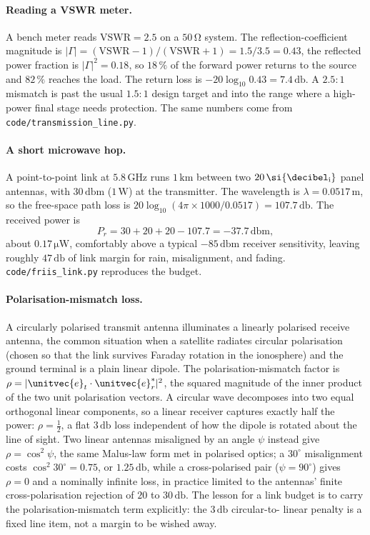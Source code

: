 \paragraph{Reading a VSWR meter.}
A bench meter reads $\text{VSWR} = 2.5$ on a $50\,\si{\ohm}$ system.
The reflection-coefficient magnitude is $|\Gamma| = (\text{VSWR}-1)/
(\text{VSWR}+1) = 1.5/3.5 = 0.43$, the reflected power fraction is
$|\Gamma|^{2} = 0.18$, so $18\,\%$ of the forward power returns to the
source and $82\,\%$ reaches the load. The return loss is $-20\log_{10}
0.43 = 7.4\,\si{\decibel}$. A $2.5{:}1$ mismatch is past the usual
$1.5{:}1$ design target and into the range where a high-power final
stage needs protection. The same numbers come from
\texttt{code/transmission\_line.py}.

\paragraph{A short microwave hop.}
A point-to-point link at $5.8\,\si{\giga\hertz}$ runs $1\,\si{\kilo
\meter}$ between two $20\,\si{\decibel\textsubscript{i}}$ panel
antennas, with $30\,\si{\decibel}\text{m}$ ($1\,\si{\watt}$) at the
transmitter. The wavelength is $\lambda = 0.0517\,\si{\meter}$, so the
free-space path loss is $20\log_{10}(4\pi\times 1000/0.0517) =
107.7\,\si{\decibel}$. The received power is
\[
P_{r} = 30 + 20 + 20 - 107.7 = -37.7\,\si{\decibel}\text{m},
\]
about $0.17\,\si{\micro\watt}$, comfortably above a typical
$-85\,\si{\decibel}\text{m}$ receiver sensitivity, leaving roughly
$47\,\si{\decibel}$ of link margin for rain, misalignment, and fading.
\texttt{code/friis\_link.py} reproduces the budget.

\paragraph{Polarisation-mismatch loss.}
A circularly polarised transmit antenna illuminates a linearly polarised
receive antenna, the common situation when a satellite radiates circular
polarisation (chosen so that the link survives Faraday rotation in the
ionosphere) and the ground terminal is a plain linear dipole. The
polarisation-mismatch factor is $\rho = |\unitvec{e}_{t}\cdot
\unitvec{e}_{r}^{*}|^{2}$, the squared magnitude of the inner product of
the two unit polarisation vectors. A circular wave decomposes into two
equal orthogonal linear components, so a linear receiver captures exactly
half the power: $\rho = \tfrac{1}{2}$, a flat $3\,\si{\decibel}$ loss
independent of how the dipole is rotated about the line of sight. Two
linear antennas misaligned by an angle $\psi$ instead give $\rho =
\cos^{2}\psi$, the same Malus-law form met in polarised optics; a
$30^{\circ}$ misalignment costs $\cos^{2}30^{\circ} = 0.75$, or
$1.25\,\si{\decibel}$, while a cross-polarised pair ($\psi = 90^{\circ}$)
gives $\rho = 0$ and a nominally infinite loss, in practice limited to
the antennas' finite cross-polarisation rejection of $20$ to
$30\,\si{\decibel}$. The lesson for a link budget is to carry the
polarisation-mismatch term explicitly: the $3\,\si{\decibel}$ circular-to-
linear penalty is a fixed line item, not a margin to be wished away.

